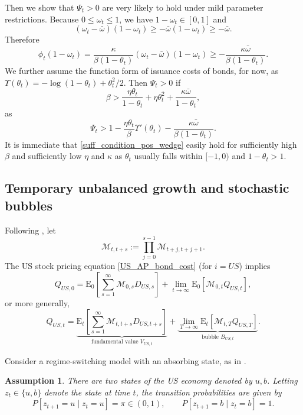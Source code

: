 \documentclass[12pt]{article}
\theoremstyle{plain}
\newtheorem{ass}{Assumption}
\begin{document}
Then we show that $\Psi_t>0$ are very likely to hold under mild parameter restrictions.
Because $0\le \omega_t\le 1$, we have $1-\omega_t\in[0,1]$ and
\[
(\omega_t-\bar\omega)(1-\omega_t)
\ge -\bar\omega(1-\omega_t)
\ge -\bar\omega.
\]
Therefore
\[
\phi_t(1-\omega_t)
=
\frac{\kappa}{\beta(1-\theta_t)}(\omega_t-\bar\omega)(1-\omega_t)
\ge
-\frac{\kappa\bar\omega}{\beta(1-\theta_t)}.
\]
We further assume the function form of issuance costs of bonds, for now, as
 $\Upsilon(\theta_t)=-\log(1-\theta_t)+\theta_t^2/2$. Then $\Psi_t >0$ if
\begin{equation} \label{suff_condition_pos_wedge}
	\beta > \frac{\eta \theta_t}{1-\theta_t}+\eta \theta_t^2 +\frac{\kappa\bar\omega}{1-\theta_t},	
\end{equation}
as
\[
\Psi_t > 1-\frac{\eta \theta_t}{\beta} \Upsilon'(\theta_t)-\frac{\kappa\bar\omega}{\beta(1-\theta_t)}.
\]
It is immediate that \eqref{suff_condition_pos_wedge} easily hold for sufficiently high $\beta$ and 
sufficiently low $\eta$ and $\kappa$ as $\theta_t$ usually falls within $[-1,0)$ and $1-\theta_t>1$.

\subsection{Temporary unbalanced growth and stochastic bubbles}

Following \citet{hirano2025technological}, let
\[
\mathcal{M}_{t,t+s}:=\prod_{j=0}^{s-1} \mathcal{M}_{t+j,t+j+1}.
\]
The US stock pricing equation \eqref{US_AP_bond_cost} (for $i=US$) implies
\[
Q_{US,0}=
\mathrm{E}_0 \left[\sum_{s=1}^{\infty} \mathcal{M}_{0,s} D_{US,s}\right]
+\lim_{t \rightarrow \infty} \mathrm{E}_0\left[\mathcal{M}_{0,t} Q_{US,t}\right],
\]
or more generally,
\[
Q_{US,t}=
\underbrace{\mathrm{E}_t \left[ \sum_{s=1}^{\infty} \mathcal{M}_{t,t+s} D_{US,t+s}\right]}_{\text{fundamental value }V_{US,t}}
+\underbrace{\lim_{T \rightarrow \infty} \mathrm{E}_t\left[\mathcal{M}_{t,T} Q_{US,T}\right]}_{\text{bubble }B_{US,t}}.
\]

Consider a regime-switching model with an absorbing state, as in \citet{weil1987confidence}.

\begin{ass}\label{ass_regime_switch}
There are two states of the US economy denoted by $u, b$. Letting $z_t \in \{u, b\}$ denote the state at time $t$,
the transition probabilities are given by
\[
P[z_{t+1} = u \mid z_t = u] = \pi \in (0,1), \qquad P[z_{t+1} = b \mid z_t = b] = 1.
\]
\end{ass}
\end{document}
